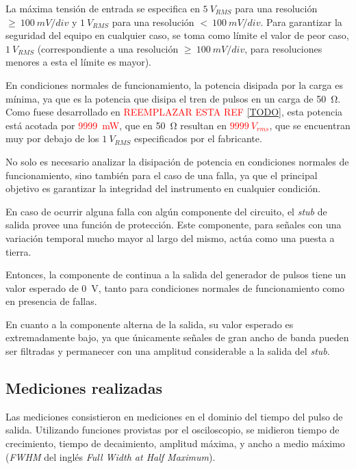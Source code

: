 La máxima tensión de entrada se especifica en $5 \ V_{RMS}$ para una resolución
$\geq \ 100 \ mV/div$ y $1 \ V_{RMS}$ para una resolución $< \ 100 \ mV/div$.
Para garantizar la seguridad del equipo en cualquier caso, se toma como límite
el valor de peor caso, $1 \ V_{RMS}$ (correspondiente a una resolución $\geq \
100 \ mV/div$, para resoluciones menores a esta el límite es mayor).

En condiciones normales de funcionamiento, la potencia disipada por la carga es
mínima, ya que es la potencia que disipa el tren de pulsos en un carga de
\qty{50}{\ohm}. Como fuese desarrollado en \textcolor{red}{REEMPLAZAR ESTA REF
\ref{TODO}}, esta potencia está acotada por
\textcolor{red}{\qty{9999}{\milli\watt}}, que en \qty{50}{\ohm} resultan en
\textcolor{red}{$9999 \ V_{rms}$}, que se encuentran muy por debajo de los $1 \
V_{RMS}$ especificados por el fabricante.

No solo es necesario analizar la disipación de potencia en condiciones normales
de funcionamiento, sino también para el caso de una falla, ya que el principal
objetivo es garantizar la integridad del instrumento en cualquier condición.

En caso de ocurrir alguna falla con algún componente del circuito, el \textit{stub}
de salida provee una función de protección. Este componente, para señales con
una variación temporal mucho mayor al largo del mismo, actúa como una puesta a
tierra.

Entonces, la componente de continua a la salida del generador de pulsos tiene un
valor esperado de \qty{0}{\volt}, tanto para condiciones normales de 
funcionamiento como en presencia de fallas.

En cuanto a la componente alterna de la salida, su valor esperado es
extremadamente bajo, ya que únicamente señales de gran ancho de banda pueden ser
filtradas y permanecer con una amplitud considerable a la salida del 
\textit{stub}.

\subsection{Mediciones realizadas}

Las mediciones consistieron en mediciones en el dominio del tiempo del pulso de
salida. Utilizando funciones provistas por el osciloscopio, se midieron tiempo
de crecimiento, tiempo de decaimiento, amplitud máxima, y ancho a medio máximo
(\textit{FWHM} del inglés \textit{Full Width at Half Maximum}).

